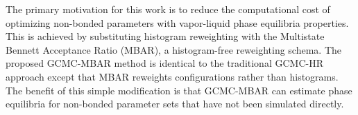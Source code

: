 \documentclass[journal=jced,manuscript=article]{achemso}
\begin{document}



The primary motivation for this work is to reduce the computational cost of optimizing non-bonded parameters with vapor-liquid phase equilibria properties. This is achieved by substituting histogram reweighting with the Multistate Bennett Acceptance Ratio (MBAR), \cite{chodera:jctc:2007,shirts-chodera:jcp:2008:mbar} a histogram-free reweighting schema. The proposed GCMC-MBAR method is identical to the traditional GCMC-HR approach except that MBAR reweights configurations rather than histograms. The benefit of this simple modification is that GCMC-MBAR can estimate phase equilibria for non-bonded parameter sets that have not been simulated directly. 
\end{document}
